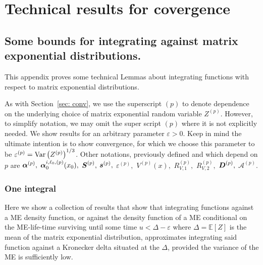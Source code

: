 \chapter{Technical results for covergence\label{app:tand}}
\section{Some bounds for integrating against matrix exponential distributions.}\label{appendix: bounds}
This appendix proves some technical Lemmas about integrating functions with respect to matrix exponential distributions. 

As with Section~\ref{sec: conv}, we use the superscript \((p)\) to denote dependence on the underlying choice of matrix exponential random variable \(Z^{(p)}\). However, to simplify notation, we may omit the super script \((p)\) where it is not explicitly needed. We show results for an arbitrary parameter \(\varepsilon>0\). Keep in mind the ultimate intention is to show convergence, for which we choose this parameter to be \(\varepsilon^{(p)}=\mathrm{Var}\left(Z^{(p)}\right)^{1/3}\). Other notations, previously defined and which depend on \(p\) are \(\boldsymbol\alpha^{(p)},\) \(\boldsymbol \alpha_0^{i,\ell_0,(p)}(x_0),\) \(\boldsymbol S^{(p)},\) \(\boldsymbol s^{(p)},\) \(\varepsilon^{(p)},\) \(V^{(p)}(x),\) \(R_{V,1}^{(p)},\) \(R_{V,2}^{(p)},\) \(\boldsymbol D^{(p)},\) \( \mathcal A^{(p)}\).

\subsection{One integral}\label{appendix: int one}
 Here we show a collection of results that show that integrating functions against a ME density function, or against the density function of a ME conditional on the ME-life-time surviving until some time \(u<\Delta-\varepsilon\) where \(\Delta = \mathbb E[Z]\) is the mean of the matrix exponential distribution, approximates integrating said function against a Kronecker delta situated at the \(\Delta\), provided the variance of the ME is sufficiently low. %
  
